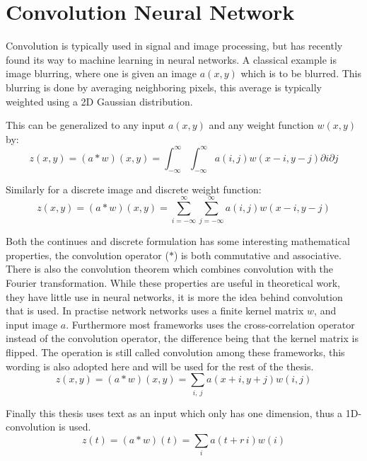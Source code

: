 \section{Convolution Neural Network}

Convolution is typically used in signal and image processing, but has recently found its way to machine learning in neural networks. A classical example is image blurring, where one is given an image $a(x, y)$ which is to be blurred. This blurring is done by averaging neighboring pixels, this average is typically weighted using a 2D Gaussian distribution.

This can be generalized to any input $a(x, y)$ and any weight function $w(x, y)$ by:
\begin{equation}
z(x, y) = (a * w)(x, y) = \int_{-\infty}^\infty \int_{-\infty}^\infty a(i, j) w(x - i, y - j) \partial i \partial j
\end{equation}

Similarly for a discrete image and discrete weight function:
\begin{equation}
z(x, y) = (a * w)(x, y) = \sum_{i = -\infty}^\infty \sum_{j = -\infty}^\infty a(i, j) w(x - i, y - j)
\end{equation}

Both the continues and discrete formulation has some interesting mathematical properties, the convolution operator ($*$) is both commutative and associative. There is also the convolution theorem which combines convolution with the Fourier transformation. While these properties are useful in theoretical work, they have little use in neural networks, it is more the idea behind convolution that is used. In practise network networks uses a finite kernel matrix $w$, and input image $a$. Furthermore most frameworks uses the cross-correlation operator instead of the convolution operator, the difference being that the kernel matrix is flipped. The operation is still called convolution among these frameworks, this wording is also adopted here and will be used for the rest of the thesis.
\begin{equation}
z(x, y) = (a * w)(x, y) = \sum_{i,\ j} a(x + i, y + j) w(i, j)
\end{equation}

Finally this thesis uses text as an input which only has one dimension, thus a 1D-convolution is used.
\begin{equation}
z(t) = (a * w)(t) = \sum_{i} a(t+r\,i) w(i)
\end{equation}

